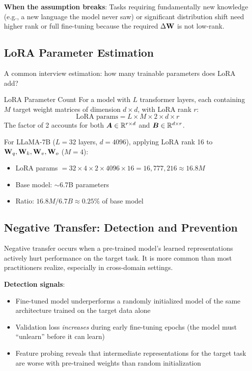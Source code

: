 \textbf{When the assumption breaks}: Tasks requiring fundamentally new knowledge (e.g., a new language the model never saw) or significant distribution shift need higher rank or full fine-tuning because the required $\Delta \mathbf{W}$ is not low-rank.

\subsection{LoRA Parameter Estimation}

A common interview estimation: how many trainable parameters does LoRA add?

\begin{mathresult}{LoRA Parameter Count}
For a model with $L$ transformer layers, each containing $M$ target weight matrices of dimension $d \times d$, with LoRA rank $r$:
\begin{equation}
\text{LoRA params} = L \times M \times 2 \times d \times r
\end{equation}
The factor of 2 accounts for both $\bm{A} \in \mathbb{R}^{r \times d}$ and $\bm{B} \in \mathbb{R}^{d \times r}$.
\end{mathresult}

\begin{example}
For LLaMA-7B ($L = 32$ layers, $d = 4096$), applying LoRA rank 16 to $\mathbf{W}_q, \mathbf{W}_k, \mathbf{W}_v, \mathbf{W}_o$ ($M = 4$):
\begin{itemize}
    \item LoRA params $= 32 \times 4 \times 2 \times 4096 \times 16 = 16{,}777{,}216 \approx 16.8M$
    \item Base model: $\sim$6.7B parameters
    \item Ratio: $16.8M / 6.7B \approx 0.25\%$ of base model
\end{itemize}
\end{example}

\subsection{Negative Transfer: Detection and Prevention}

Negative transfer occurs when a pre-trained model's learned representations actively hurt performance on the target task. It is more common than most practitioners realize, especially in cross-domain settings.

\textbf{Detection signals}:
\begin{itemize}
    \item Fine-tuned model underperforms a randomly initialized model of the same architecture trained on the target data alone
    \item Validation loss \textit{increases} during early fine-tuning epochs (the model must ``unlearn'' before it can learn)
    \item Feature probing reveals that intermediate representations for the target task are worse with pre-trained weights than random initialization
\end{itemize}

